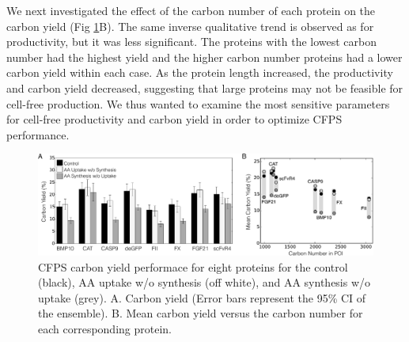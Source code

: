 \documentclass[journal=asbcd6,manuscript=article]{achemso}
\begin{document}
We next investigated the effect of the carbon number of each protein on the carbon yield (Fig \ref{fig:Yield_POI}B).
The same inverse qualitative trend is observed as for productivity, but it was less significant.
The proteins with the lowest carbon number had the highest yield and the higher carbon number proteins had a lower carbon yield within each case. 
As the protein length increased, the productivity and carbon yield decreased, suggesting that large proteins may not be feasible for cell-free production.
We thus wanted to examine the most sensitive parameters for cell-free productivity and carbon yield in order to optimize CFPS performance.
\begin{figure}[t!]
\centering
\includegraphics[width=1.00\textwidth]{./Figures/Yield_POI.pdf}
\caption{CFPS carbon yield performace for eight proteins for the control (black), AA uptake w/o synthesis (off white), and AA synthesis w/o uptake (grey). A. Carbon yield (Error bars represent the 95\% CI of the ensemble). B. Mean carbon yield versus the carbon number for each corresponding protein.}
\label{fig:Yield_POI}
\end{figure}
\end{document}

